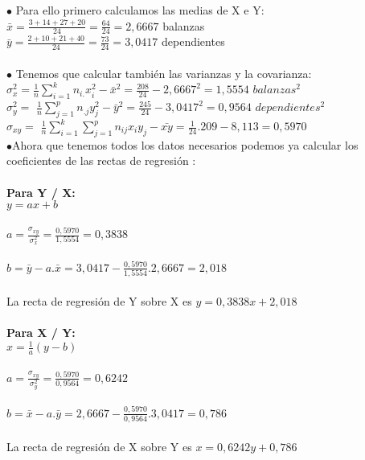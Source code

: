 \subproblem	
	$\bullet$ Para ello primero calculamos las medias de X e Y: \\
	
	$\bar{x} = \frac{3 + 14 + 27 +20}{24} = \frac{64}{24} = 2,6667 $ balanzas
	\\ 
	
	$\bar{y} = \frac{2 + 10+21 +40}{24} = \frac{73}{24} = 3,0417  $ dependientes
	\\
	\\
	
	$\bullet$ Tenemos que calcular también las varianzas y la covarianza: \\
	
	
	
	$\sigma_{x}^{2} =  $$\frac{1}{n}\sum^{k}_{i=1}n_{i.}x_{i}^{2} - \bar{x}^{2} = \frac{208}{24} - 2,6667^{2} = 1,5554 $ $ balanzas^{2} $ \\
	
	$\sigma_{y}^{2} = $ $\frac{1}{n}\sum^{p}_{j=1}n_{.j}y_{j}^{2} - \bar{y}^{2} = \frac{245}{24} - 3,0417 ^{2} = 0,9564 $ $dependientes^{2}$ \\
	
	$\sigma_{xy} = $ $\frac{1}{n}\sum^{k}_{i=1}\sum^{p}_{j=1}n_{ij}x_{i}y_{j} - \bar{xy}= \frac{1}{24}.209 - 8,113 = 0,5970 $ \\
	
	
	$\bullet$Ahora que tenemos todos los datos necesarios podemos ya calcular los coeficientes de las rectas de regresión :\\ \\
	\textbf{Para Y / X:}\\
	$y = ax +b $\\ \\
	$a = \frac{\sigma_{xy}}{\sigma_{x}^{2}} = \frac{0,5970}{1,5554} = 0,3838$\\ \\
	$b = \bar{y} - a.\bar{x} = 3,0417 - \frac{0,5970}{1,5554}. 2,6667 = 2,018$\\ \\
	La recta de regresión de Y sobre X es
	$y = 0,3838x + 2,018 $\\ \\
	\textbf{Para X / Y:}\\
	$x = \frac{1}{a}( y- b) $\\ \\
	$a = \frac{\sigma_{xy}}{\sigma_{y}^{2}} = \frac{0,5970}{ 0,9564 } = 0,6242$\\ \\
	$b = \bar{x} - a.\bar{y} = 2,6667 -  \frac{0,5970}{ 0,9564 }.3,0417 = 0,786$\\ \\La recta de regresión de X sobre Y es
	$x = 0,6242y +  0,786 $\\ 
\subproblem	
	
